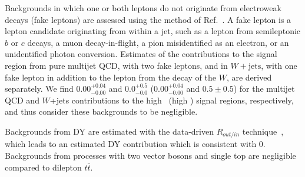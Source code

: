 
Backgrounds  in  which one  or  both  leptons  do not  originate  from
electroweak decays  (fake leptons) are assessed  using the method
of  Ref.~\cite{ref:top}.  A fake  lepton is  a lepton  candidate
originating from within a jet,  such as a lepton from semileptonic $b$
or  $c$ decays,  a muon  decay-in-flight, a  pion misidentified  as an
electron,  or an  unidentified  photon conversion.   Estimates of  the
contributions to  the signal region  from pure multijet QCD,  with two
fake leptons, and in $W+\mathrm{jets}$, with one fake lepton
in  addition to  the lepton  from the  decay of  the $W$,  are derived
separately. We find $0.00^{+0.04}_{-0.00}$ and $0.0^{+0.5}_{-0.0}$ 
($0.00^{+0.04}_{-0.00}$ and $0.5 \pm 0.5$)
for the  multijet QCD  and $W$+jets  contributions to the high \MET\
(high \Ht) signal regions, respectively,  and thus
consider these backgrounds to be negligible.

Backgrounds from DY are estimated with the data-driven $R_{out/in}$ technique~\cite{ref:top},
which leads to an estimated DY contribution which is consistent with 0.
Backgrounds from processes with two vector bosons and single top 
are negligible compared to dilepton $t\bar{t}$. 
